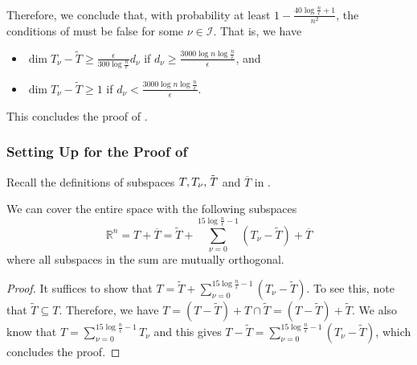 Therefore, we conclude that, with probability at least $1-\frac{40\log\frac{n}{\epsilon}+1}{n^2}$, the conditions of  must be false for some $\nu \in \mathcal{I}$. That is, we have
\begin{itemize}
\item $\dim{T_{\nu} -\tilde{T}} \geq \frac{\epsilon}{300\log\frac{n}{\epsilon}} d_{\nu}$ if $d_{\nu} \geq \frac{3000\log n\log\frac{n}{\epsilon}}{\epsilon}$, and 
\item $\dim{T_{\nu} -\tilde{T}} \geq 1$ if $d_{\nu} < \frac{3000\log n\log\frac{n}{\epsilon}}{\epsilon}$.
\end{itemize}
This concludes the proof of .


\subsubsection*{Setting Up for the Proof of }

Recall the definitions of subspaces $T,T_\nu,{\tilde{\mathit{T}}}$ and $\overline{T}$ in .

\begin{proposition}\label{prop:decomp space}
We can cover the entire space with the following subspaces
\begin{equation}\label{eq:SplitSpace}
 \mathbb{R}^n = T + \overline{T} = \tilde{T} + \sum_{\nu = 0}^{15\log \frac{n}{\epsilon}-1}(T_{\nu} -\tilde{T}) + \overline{T}
\end{equation}
where all subspaces in the sum are mutually orthogonal.
\end{proposition}
\begin{proof}
    It suffices to show that $T = \tilde{T} + \sum_{\nu = 0}^{15\log \frac{n}{\epsilon}-1}(T_{\nu} -\tilde{T})$.
    To see this, note that $\tilde{T}\subseteq T$. Therefore, we have $T = (T-\tilde{T}) + T\cap \tilde{T} = (T - \tilde{T}) + \tilde{T}$. We also know that $ T = \sum_{\nu=0}^{15\log \frac{n}{\epsilon}-1}T_{\nu}$ and this gives
$T - \tilde{T} = \sum_{\nu=0}^{15\log \frac{n}{\epsilon}-1} (T_{\nu}-\tilde{T})$, which concludes the proof.
\end{proof}


